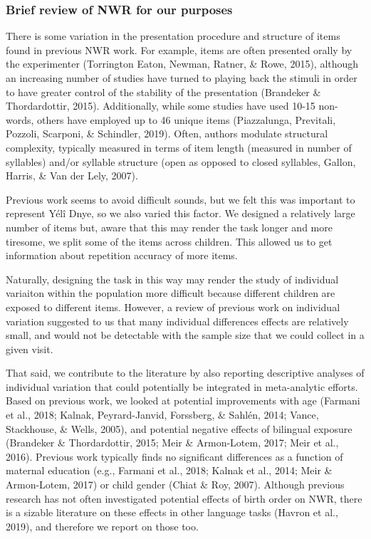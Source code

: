 \documentclass[english,,man,floatsintext]{apa6}
\begin{document}
\hypertarget{brief-review-of-nwr-for-our-purposes}{%
\subsubsection{Brief review of NWR for our purposes}\label{brief-review-of-nwr-for-our-purposes}}

There is some variation in the presentation procedure and structure of items found in previous NWR work. For example, items are often presented orally by the experimenter (Torrington Eaton, Newman, Ratner, \& Rowe, 2015), although an increasing number of studies have turned to playing back the stimuli in order to have greater control of the stability of the presentation (Brandeker \& Thordardottir, 2015). Additionally, while some studies have used 10-15 non-words, others have employed up to 46 unique items (Piazzalunga, Previtali, Pozzoli, Scarponi, \& Schindler, 2019). Often, authors modulate structural complexity, typically measured in terms of item length (measured in number of syllables) and/or syllable structure (open as opposed to closed syllables, Gallon, Harris, \& Van der Lely, 2007).

Previous work seems to avoid difficult sounds, but we felt this was important to represent Yélî Dnye, so we also varied this factor. We designed a relatively large number of items but, aware that this may render the task longer and more tiresome, we split some of the items across children. This allowed us to get information about repetition accuracy of more items.

Naturally, designing the task in this way may render the study of individual variaiton within the population more difficult because different children are exposed to different items. However, a review of previous work on individual variation suggested to us that many individual differences effects are relatively small, and would not be detectable with the sample size that we could collect in a given visit.

That said, we contribute to the literature by also reporting descriptive analyses of individual variation that could potentially be integrated in meta-analytic efforts. Based on previous work, we looked at potential improvements with age (Farmani et al., 2018; Kalnak, Peyrard-Janvid, Forssberg, \& Sahlén, 2014; Vance, Stackhouse, \& Wells, 2005), and potential negative effects of bilingual exposure (Brandeker \& Thordardottir, 2015; Meir \& Armon-Lotem, 2017; Meir et al., 2016). Previous work typically finds no significant differences as a function of maternal education (e.g., Farmani et al., 2018; Kalnak et al., 2014; Meir \& Armon-Lotem, 2017) or child gender (Chiat \& Roy, 2007). Although previous research has not often investigated potential effects of birth order on NWR, there is a sizable literature on these effects in other language tasks (Havron et al., 2019), and therefore we report on those too.
\end{document}
